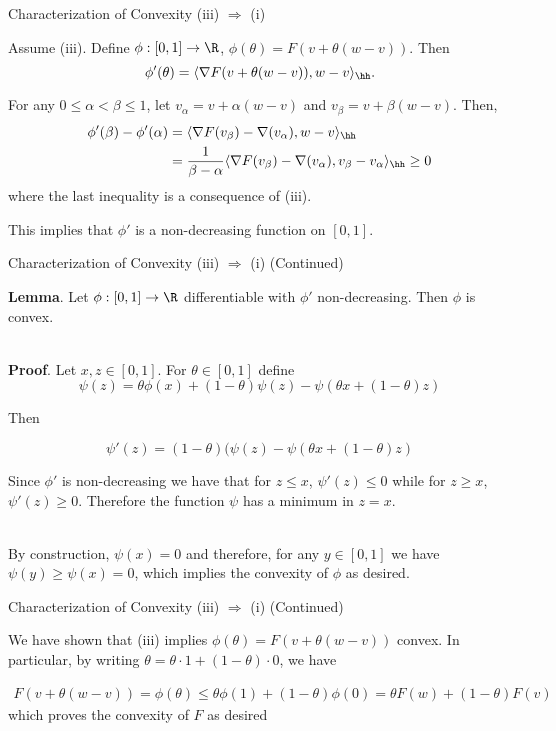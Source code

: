 \documentclass[10pt,mathserif]{beamer}
\begin{document}
\begin{frame}{Characterization of Convexity (iii) $\Rightarrow$ (i)}

Assume (iii). Define $\phi:[0,1]\to\R$, $\phi(\theta) = F(v + \theta(w-v))$. Then 
$$
\phi'(\theta) = \langle\nabla F(v + \theta(w-v)),w - v\rangle_\hh.
$$

For any $0\leq\alpha<\beta\leq1$, let $v_\alpha = v + \alpha(w-v)$ and  $v_\beta = v + \beta(w-v)$. Then,
\begin{align*}
\phi'(\beta) - \phi'(\alpha) & = \langle\nabla F(v_\beta) - \nabla(v_\alpha),w - v\rangle_\hh \\
                             & = \frac{1}{\beta-\alpha} \langle\nabla F(v_\beta) - \nabla(v_\alpha),v_\beta - v_\alpha\rangle_\hh \geq 0
\end{align*}
%
where the last inequality is a consequence of (iii).

\vfill

This implies that $\phi'$ is a non-decreasing function on $[0,1]$.
\end{frame}

\begin{frame}{Characterization of Convexity (iii) $\Rightarrow$ (i) (Continued)}

{\bf Lemma}. Let $\phi:[0,1]\to\R$ differentiable with $\phi'$ non-decreasing. Then $\phi$ is convex. 

\ \\

{\bf Proof}. Let $x,z\in[0,1]$. For $\theta\in[0,1]$ define
$$
\psi(z) = \theta\phi(x) + (1-\theta)\psi(z) - \psi(\theta x + (1-\theta)z)
$$

Then

$$
\psi'(z) = (1-\theta) (\psi(z) - \psi(\theta x + (1-\theta) z)
$$

Since $\phi'$ is non-decreasing we have that for $z\leq x$, $\psi'(z)\leq0$ while for $z\geq x$, $\psi'(z)\geq0$. Therefore the function $\psi$ has a minimum in $z = x$. 

\ \\

By construction, $\psi(x) = 0$ and therefore, for any $y\in[0,1]$ we have $\psi(y)\geq\psi(x) = 0$, which implies the convexity of $\phi$ as desired.

\end{frame}

\begin{frame}{Characterization of Convexity (iii) $\Rightarrow$ (i) (Continued)}

We have shown that (iii) implies $\phi(\theta) = F(v + \theta(w-v))$ convex. In particular, by writing $\theta = \theta \cdot 1 + (1-\theta) \cdot 0$, we have


\begin{align*}
F(v + \theta(w-v)) = \phi(\theta) \leq \theta\phi(1) + (1-\theta) \phi(0) = \theta F(w) + (1-\theta) F(v)
\end{align*}
%
which proves the convexity of $F$ as desired


\end{frame}
\end{document}
